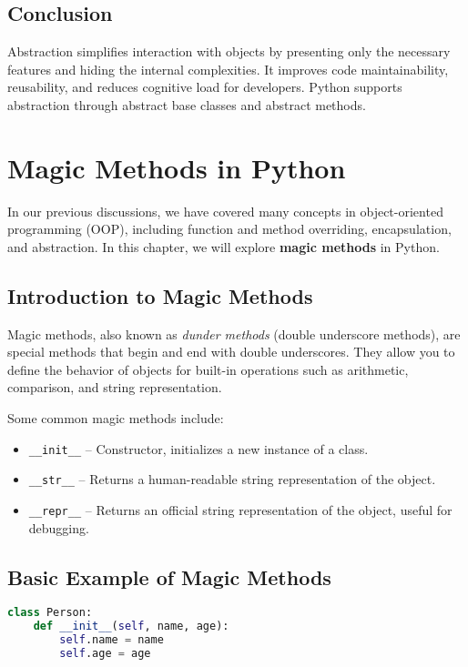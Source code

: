 \section{Conclusion}

Abstraction simplifies interaction with objects by presenting only the necessary features and hiding the internal complexities. It improves code maintainability, reusability, and reduces cognitive load for developers. Python supports abstraction through abstract base classes and abstract methods.


\chapter{Magic Methods in Python}

In our previous discussions, we have covered many concepts in object-oriented programming (OOP), including function and method overriding, encapsulation, and abstraction. In this chapter, we will explore \textbf{magic methods} in Python.

\section{Introduction to Magic Methods}

Magic methods, also known as \emph{dunder methods} (double underscore methods), are special methods that begin and end with double underscores. They allow you to define the behavior of objects for built-in operations such as arithmetic, comparison, and string representation.

Some common magic methods include:

\begin{itemize}
    \item \texttt{\_\_init\_\_} -- Constructor, initializes a new instance of a class.
    \item \texttt{\_\_str\_\_} -- Returns a human-readable string representation of the object.
    \item \texttt{\_\_repr\_\_} -- Returns an official string representation of the object, useful for debugging.
\end{itemize}

\section{Basic Example of Magic Methods}

\begin{lstlisting}[language=Python, caption=Defining a Class with Magic Methods]
class Person:
    def __init__(self, name, age):
        self.name = name
        self.age = age
\end{lstlisting}

